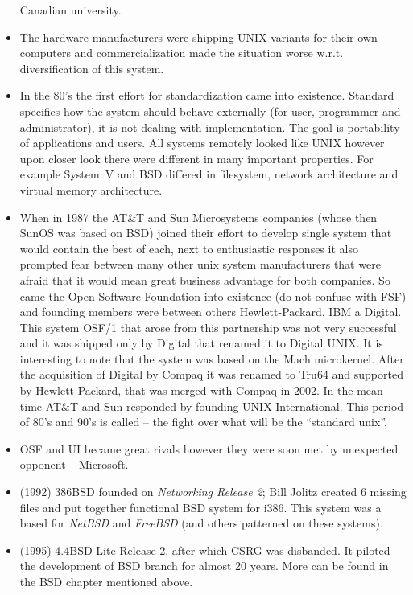 \begin{itemize}
Canadian university.
\item The hardware manufacturers were shipping UNIX variants for their own
computers and commercialization made the situation worse w.r.t.
diversification of this system.
\item In the 80's the first effort for standardization came into existence.
Standard specifies how the system should behave externally (for user, programmer
and administrator), it is not dealing with implementation. The goal is
portability of applications and users. All systems remotely looked like UNIX
however upon closer look there were different in many important properties.
For example System~V and BSD differed in filesystem, network architecture and
virtual memory architecture.
\item When in 1987 the AT\&T and Sun Microsystems companies (whose then SunOS
was based on BSD) joined their effort to develop single system that would
contain the best of each, next to enthusiastic responses it also prompted fear
between many other unix system manufacturers that were afraid that it would mean
great business advantage for both companies. So came the Open Software
Foundation into existence (do not confuse with FSF) and founding members were
between others Hewlett-Packard, IBM a Digital. This system OSF/1 that arose from
this partnership was not very successful and it was shipped only by Digital that
renamed it to Digital UNIX. It is interesting to note that the system was based
on the Mach microkernel. After the acquisition of Digital by Compaq it was
renamed to Tru64 and supported by Hewlett-Packard, that was merged with
Compaq in 2002. In the mean time AT\&T and Sun responded by founding UNIX
International. This period of 80's and 90's is called  -- the
fight over what will be the ``standard unix''.
\item OSF and UI became great rivals however they were soon met by unexpected
opponent -- Microsoft.
\item (1992) 386BSD founded on \emph{Networking Release 2}; Bill Jolitz
created 6 missing files and put together functional BSD system for i386.
This system was a based for \emph{NetBSD} and \emph{FreeBSD} (and others
patterned on these systems).
\item (1995) 4.4BSD-Lite Release 2, after which CSRG was disbanded. It piloted
the development of BSD branch for almost 20 years. More can be found in the BSD
chapter mentioned above.
\end{itemize}

\endinput
